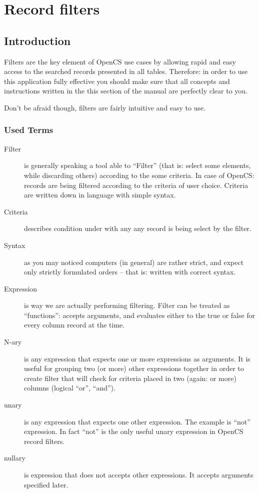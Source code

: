 \section{Record filters}
\subsection{Introduction}
Filters are the key element of OpenCS use cases by allowing rapid and easy access to the searched records presented in all tables.
Therefore: in order to use this application fully effective you should make sure that all concepts and instructions written in
the this section of the manual are perfectly clear to you.

Don't be afraid though, filters are fairly intuitive and easy to use.

\subsubsection{Used Terms}

\begin{description}
 \item[Filter] is generally speaking a tool able to ``Filter'' (that is: select some elements, while discarding others) according
 to the some criteria. In case of OpenCS: records are being filtered according to the criteria of user choice. Criteria are written
 down in language with simple syntax.
 \item[Criteria] describes condition under with any any record is being select by the filter.
 \item[Syntax] as you may noticed computers (in general) are rather strict, and expect only strictly formulated orders -- that is:
 written with correct syntax.
 \item[Expression] is way we are actually performing filtering. Filter can be treated as ``functions'': accepts arguments, and evaluates
 either to the true or false for every column record at the time.
 \item[N-ary] is any expression that expects one or more expressions as arguments. It is useful for grouping two (or more) other expressions
 together in order to create filter that will check for criteria placed in two (again: or more) columns (logical ``or'', ``and'').
 \item[unary] is any expression that expects one other expression. The example is ``not'' expression. In fact ``not'' is the only useful
 unary expression in OpenCS record filters.
 \item[nullary] is expression that does not accepts other expressions. It accepts arguments specified later.
\end{description}

